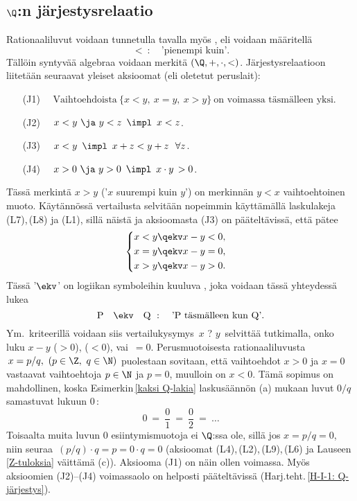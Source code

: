 \subsection{$\Q$:n järjestysrelaatio}
%

Rationaaliluvut voidaan tunnetulla tavalla myös , eli voidaan määritellä
\[
<\ : \quad \text{'pienempi kuin'}.
\]
Tällöin syntyvää algebraa voidaan merkitä $(\Q,+,\cdot,<)$. Järjestysrelaatioon liitetään
seuraavat yleiset aksioomat (eli oletetut peruslait):

\pagebreak

\begin{itemize}
\item[(J1)] $\quad \text{Vaihtoehdoista}\ \{x<y,\ x=y,\ x>y\}\ 
                                          \text{on voimassa täsmälleen yksi}.$
\item[(J2)] $\quad x<y\ \ja\ y<z \,\ \impl\,\ x<z$.
\item[(J3)] $\quad x<y \,\ \impl\,\ x+z < y+z \ \ \forall z$.
\item[(J4)] $\quad x > 0 \ \ja\ y > 0 \,\ \impl\,\ x \cdot y\, > 0$.
\end{itemize}
Tässä merkintä $x>y$ ('$x$ suurempi kuin $y$') on merkinnän $y<x$ vaihtoehtoinen muoto.
Käytännössä vertailusta selvitään nopeimmin käyttämällä laskulakeja (L7),\,(L8) ja (L1), sillä
näistä ja aksioomasta (J3) on pääteltävissä, että pätee
\[ 
\begin{cases} \begin{aligned}
x<y &\qekv x-y < 0, \\ x=y &\qekv x-y = 0, \\ x>y &\qekv x-y > 0.
\end{aligned} \end{cases}
\] 
Tässä '$\ekv$' on logiikan symboleihin kuuluva
, joka voidaan tässä 
yhteydessä lukea
\[
\text{P} \quad \ekv \quad \text{Q}\ : \quad \text{'P täsmälleen kun Q'}.
\]
Ym.\ kriteerillä voidaan siis vertailukysymys $\,x$ ? $y\,$ selvittää tutkimalla, onko luku 
$x-y$ \kor{positiivinen} ($>0$), \kor{negatiivinen} ($<0$), vai $\,=0$. Perusmuotoisesta
rationaaliluvusta $\,x = p/q,\ (p\in\Z,\ q\in \N)$ puolestaan sovitaan, että vaihtoehdot
$x>0$ ja $x=0$ vastaavat vaihtoehtoja $p\in\N$ ja $p=0$, muulloin on $x<0$. Tämä sopimus on
mahdollinen, koska Esimerkin\,\ref{kaksi Q-lakia} laskusäännön (a) mukaan luvut $0/q$ samastuvat
lukuun $0$\,:
\[
0\ =\ \dfrac{0}{1}\ =\ \dfrac{0}{2}\ =\ \ldots
\]
Toisaalta muita luvun $0$ esiintymismuotoja ei $\Q$:ssa ole, sillä jos $x=p/q=0$, niin seuraa
$\,(p/q) \cdot q = p = 0 \cdot q = 0$ (aksioomat (L4),\,(L2),\,(L9),\,(L6) ja Lauseen
\ref{Z-tuloksia} väittämä (c)). Aksiooma (J1) on näin ollen voimassa. Myös aksioomien (J2)--(J4)
voimassaolo on helposti pääteltävissä (Harj.teht.\,\ref{H-I-1: Q-järjestys}).

